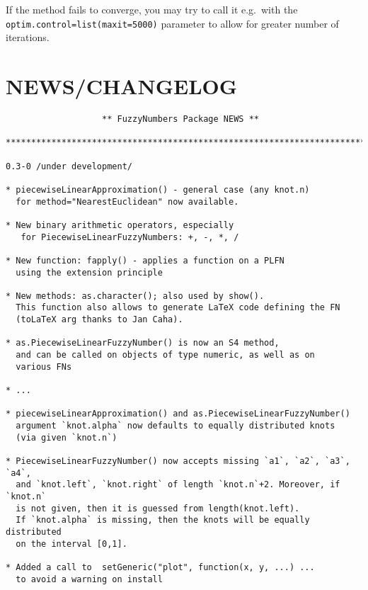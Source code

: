 \documentclass[11pt]{article}\usepackage{graphicx, color}
\makeatletter
\newenvironment{kframe}{%
 \def\at@end@of@kframe{}%
 \ifinner\ifhmode%
  \def\at@end@of@kframe{\end{minipage}}%
  \begin{minipage}{\columnwidth}%
 \fi\fi%
 \def\FrameCommand##1{\hskip\@totalleftmargin \hskip-\fboxsep
 \colorbox{shadecolor}{##1}\hskip-\fboxsep
     \hskip-\linewidth \hskip-\@totalleftmargin \hskip\columnwidth}%
 \MakeFramed {\advance\hsize-\width
   \@totalleftmargin\z@ \linewidth\hsize
   \@setminipage}}%
 {\par\unskip\endMakeFramed%
 \at@end@of@kframe}
\newenvironment{knitrout}{}{} %
\makeatother
\begin{document}
If the method fails to converge, you may try to call it
e.g.~with the \texttt{optim.control=list(maxit=\allowbreak{}5000)} parameter
to allow for greater number of iterations.









\section{NEWS/CHANGELOG}

\begin{knitrout}\small
{}\color{fgcolor}\begin{kframe}
\begin{verbatim}
                   ** FuzzyNumbers Package NEWS **

***************************************************************************

0.3-0 /under development/

* piecewiseLinearApproximation() - general case (any knot.n)
  for method="NearestEuclidean" now available.

* New binary arithmetic operators, especially
   for PiecewiseLinearFuzzyNumbers: +, -, *, /

* New function: fapply() - applies a function on a PLFN
  using the extension principle

* New methods: as.character(); also used by show().
  This function also allows to generate LaTeX code defining the FN
  (toLaTeX arg thanks to Jan Caha).

* as.PiecewiseLinearFuzzyNumber() is now an S4 method,
  and can be called on objects of type numeric, as well as on
  various FNs

* ...

* piecewiseLinearApproximation() and as.PiecewiseLinearFuzzyNumber()
  argument `knot.alpha` now defaults to equally distributed knots
  (via given `knot.n`)

* PiecewiseLinearFuzzyNumber() now accepts missing `a1`, `a2`, `a3`, `a4`,
  and `knot.left`, `knot.right` of length `knot.n`+2. Moreover, if `knot.n`
  is not given, then it is guessed from length(knot.left).
  If `knot.alpha` is missing, then the knots will be equally distributed
  on the interval [0,1].

* Added a call to  setGeneric("plot", function(x, y, ...) ...
  to avoid a warning on install


\end{verbatim}
\end{kframe}
\end{knitrout}
\end{document}
